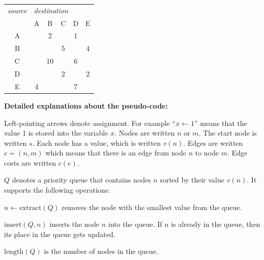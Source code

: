 \documentclass[a4paper]{article}
\begin{document}
\begin{center}
  \begin{minipage}{0.45\columnwidth}
    \begin{tabular}{|*{6}{c|}}
      \hline
      \emph{source}
      &
      \multicolumn{5}{l|}{\emph{destination}} \\
        &  A &  B &  C &  D &  E \\
      \hline
      A &    &  2 &    &  1 &    \\
      \hline
      B &    &    &  5 &    &  4 \\
      \hline
      C &    & 10 &    &  6 &    \\
      \hline
      D &    &    &  2 &    &  2 \\
      \hline
      E &  4 &    &    &  7 &    \\
      \hline
    \end{tabular}
  \end{minipage}
\end{center}

\vfill

\noindent\textbf{Detailed explanations about the pseudo-code:}

Left-pointing arrows denote assignment.
For example ``$x \leftarrow 1$'' means that the value 1 is stored into the variable $x$.
Nodes are written $n$ or $m$.
The start node is written $s$.
Each node has a value, which is written $v(n)$.
Edges are written $e=(n,m)$ which means that there is an edge from node $n$ to node $m$.
Edge costs are written $c(e)$.

$Q$ denotes a priority queue that contains nodes $n$ sorted by their value $v(n)$.
It supports the following operations:
\begin{compactitem}
\item
  $n \leftarrow \text{extract}(Q)$ removes the node with the smallest value from the queue.
\item
  $\text{insert}(Q,n)$ inserts the node $n$ into the queue.
  If $n$ is already in the queue, then its place in the queue gets updated.
\item
  $\text{length}(Q)$ is the number of nodes in the queue.
\end{compactitem}
\end{document}
